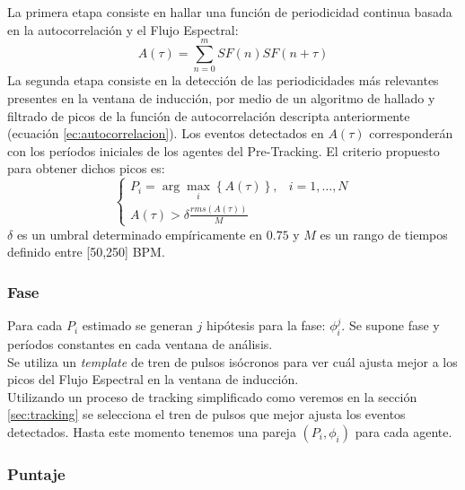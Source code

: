\documentclass[12pt,a4paper,titlepage]{report}
\begin{document}
La primera etapa consiste en hallar una función de periodicidad continua basada en la autocorrelación y el Flujo Espectral:
\begin{equation}
	A(\tau) = \sum\limits_{n=0}^{m}SF(n)SF(n+\tau)
	\label{ec:autocorrelacion}
\end{equation}
La segunda etapa consiste en la detección de las periodicidades más relevantes presentes en la ventana de inducción, por medio de un algoritmo de hallado y filtrado de picos de la función de autocorrelación descripta anteriormente (ecuación \ref{ec:autocorrelacion}). Los eventos detectados en $A(\tau)$ corresponderán con los períodos iniciales de los agentes del Pre-Tracking. El criterio propuesto para obtener dichos picos es:
\begin{equation*}
	\begin{cases}
	P_i = \arg\max_i \left\{ A(\tau) \right\}, & i=1,\dots, N\\
	A(\tau)>\delta \frac{rms(A(\tau))}{M} & 
	\end{cases}
	\label{ec:period}
\end{equation*}
$\delta$ es un umbral determinado empíricamente en $0.75$ y $M$ es un rango de tiempos definido entre [50,250] BPM.


\subsubsection{Fase}

Para cada $P_i$ estimado se generan $j$ hipótesis para la fase: $\phi_i^j$. Se supone fase y períodos constantes en cada ventana de análisis.\\

Se utiliza un \emph{template} de tren de pulsos isócronos para ver cuál ajusta mejor a los picos del Flujo Espectral en la ventana de inducción.\\

Utilizando un proceso de tracking simplificado como veremos en la sección \ref{sec:tracking} se selecciona el tren de pulsos que mejor ajusta los eventos detectados. Hasta este momento tenemos una pareja $(P_i,\phi _i)$ para cada agente.

\subsubsection{Puntaje}
\end{document}
